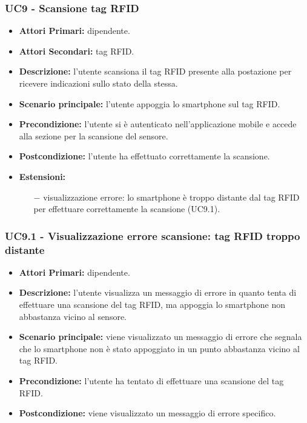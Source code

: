 \subsubsection{ UC9 - Scansione tag RFID}
\begin{itemize}
	\item\textbf{Attori Primari:} dipendente.
	\item\textbf{Attori Secondari:} tag RFID.
	\item\textbf{Descrizione:} l’utente scansiona il tag RFID presente alla postazione per ricevere indicazioni sullo stato della stessa.
	\item\textbf{Scenario principale:} l’utente appoggia lo smartphone sul tag RFID.
	\item\textbf{Precondizione:} l’utente si è autenticato nell'applicazione mobile e accede alla sezione per la scansione del sensore.
	\item\textbf{Postcondizione:} l’utente ha effettuato correttamente la scansione.
	\item\textbf{Estensioni:}
	\begin{itemize}
		\item[$-$] visualizzazione errore: lo smartphone è troppo distante dal tag RFID per effettuare correttamente la scansione (UC9.1).
	\end{itemize}
\end{itemize}
\subsubsection{ UC9.1 - Visualizzazione errore scansione: tag RFID troppo distante}
\begin{itemize}
	\item\textbf{Attori Primari:} dipendente.
	\item\textbf{Descrizione:} l’utente visualizza un messaggio di errore in quanto tenta di effettuare una scansione del tag RFID, ma appoggia lo smartphone non abbastanza vicino al sensore.
	\item\textbf{Scenario principale:} viene visualizzato un messaggio di errore che segnala che lo smartphone non è stato appoggiato in un punto abbastanza vicino
	al tag RFID.
	\item\textbf{Precondizione:} l’utente ha tentato di effettuare una scansione del tag RFID.
	\item\textbf{Postcondizione:} viene visualizzato un messaggio di errore specifico.
\end{itemize}

